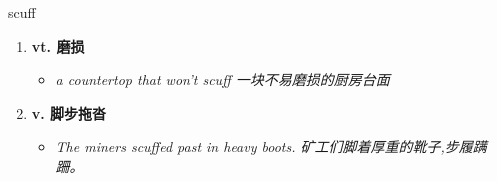 
\begin{frame}
{\huge scuff}
\begin{center}
\begin{enumerate}\Large
  \item \textbf{vt. 磨损}
  \begin{itemize}
    \item \em{\Large{a countertop that won't scuff 一块不易磨损的厨房台面}}
  \end{itemize}
  \item \textbf{v. 脚步拖沓}
  \begin{itemize}
    \item \em{\Large{The miners scuffed past in heavy boots. 矿工们脚着厚重的靴子,步履蹒跚。}}
  \end{itemize}
\end{enumerate}
\end{center}
\end{frame}
